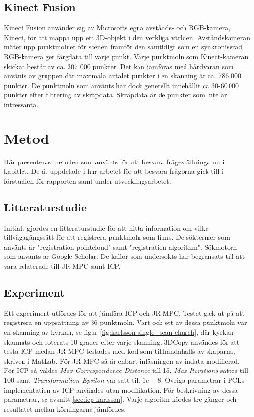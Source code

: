 \subsection{Kinect Fusion}
\label{sec:kinect-karlsson}
Kinect Fusion använder sig av Microsofts egna avstånds- och RGB-kamera, Kinect, för att mappa upp ett 3D-objekt i den verkliga världen. Avståndskameran mäter upp punktmolnet för scenen framför den samtidigt som en synkroniserad RGB-kamera ger färgdata till varje punkt. 
Varje punktmoln som Kinect-kameran skickar består av ca. 307 000 punkter. Det kan jämföras med hårdvaran som använts av gruppen där maximala antalet punkter i en skanning är ca. 786 000 punkter. De punktmoln som använts har dock generellt innehållit ca 30-60\,000 punkter efter filtrering av skräpdata. Skräpdata är de punkter som inte är intressanta.

\section{Metod}
\label{sec:method-karlsson}

Här presenteras metoden som använts för att besvara frågeställningarna i kapitlet. De är uppdelade i hur arbetet för att besvara frågorna gick till i förstudien för rapporten samt under utvecklingsarbetet.

\subsection{Litteraturstudie}
Initialt gjordes en litteraturstudie för att hitta information om vilka tillvägagångssätt för att registrera punktmoln som finns. De söktermer som använts är "registration pointcloud" samt "registration algorithm". Sökmotorn som använts är Google Scholar. De källor som undersökts har begränsats till att vara relaterade till JR-MPC samt ICP.

\subsection{Experiment}
Ett experiment utfördes för att jämföra ICP och JR-MPC. Testet gick ut på att registrera en uppsättning av 36 punktmoln. Vart och ett av dessa punktmoln var en skanning av kyrkan, se figur \ref{fig:karlsson-single_scan-church}, där kyrkan skannats och roterats 10 grader efter varje skanning. 3DCopy användes för att testa ICP medan JR-MPC testades med kod som tillhandahålls av skaparna, skriven i MatLab. För JR-MPC så är enbart inläsningen av indata modifierad. För ICP så valdes \textit{Max Correspondence Distance} till 15, \textit{Max Iterations} sattes till 100 samt \textit{Transformation Epsilon} var satt till $ 1e-8 $. Övriga parametrar i PCLs implementation av ICP användes utan modifikation. För beskrivning av dessa parametrar, se avsnitt \ref{sec:icp-karlsson}. Varje algoritm kördes tre gånger och resultatet mellan körningarna jämfördes.

